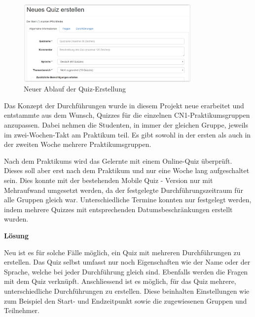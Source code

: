 \begin{figure}[H]
	\centering
	\includegraphics[width=0.8\textwidth]{Images/Quiz_Erstellen1.PNG}
	\caption{Neuer Ablauf der Quiz-Erstellung}
\end{figure}

Das Konzept der Durchführungen wurde in diesem Projekt neue erarbeitet und entstammte aus dem Wunsch, Quizzes für die einzelnen \acrshort{CN1}-Praktikumsgruppen anzupassen. Dabei nehmen die Studenten, in immer der gleichen Gruppe, jeweils im zwei-Wochen-Takt am Praktikum teil. Es gibt sowohl in der ersten als auch in der zweiten Woche mehrere Praktikumsgruppen.

Nach dem Praktikums wird das Gelernte mit einem Online-Quiz überprüft. Dieses soll aber erst nach dem Praktikum und nur eine Woche lang aufgeschaltet sein. Dies konnte mit der bestehenden Mobile Quiz - Version nur mit Mehraufwand umgesetzt werden, da der festgelegte Durchführungszeitraum für alle Gruppen gleich war. Unterschiedliche Termine konnten nur festgelegt werden, indem mehrere Quizzes mit entsprechenden Datumsbeschränkungen erstellt wurden.

\bigskip\bigskip

\textbf{Lösung}
\bigskip

Neu ist es für solche Fälle möglich, ein Quiz mit mehreren Durchführungen zu erstellen. Das Quiz selbst umfasst nur noch Eigenschaften wie der Name oder der Sprache, welche bei jeder Durchführung gleich sind. Ebenfalls werden die Fragen mit dem Quiz verknüpft. Anschliessend ist es möglich, für das Quiz mehrere, unterschiedliche Durchführungen zu erstellen. Diese beinhalten Einstellungen wie zum Beispiel den Start- und Endzeitpunkt sowie die zugewiesenen Gruppen und Teilnehmer.


